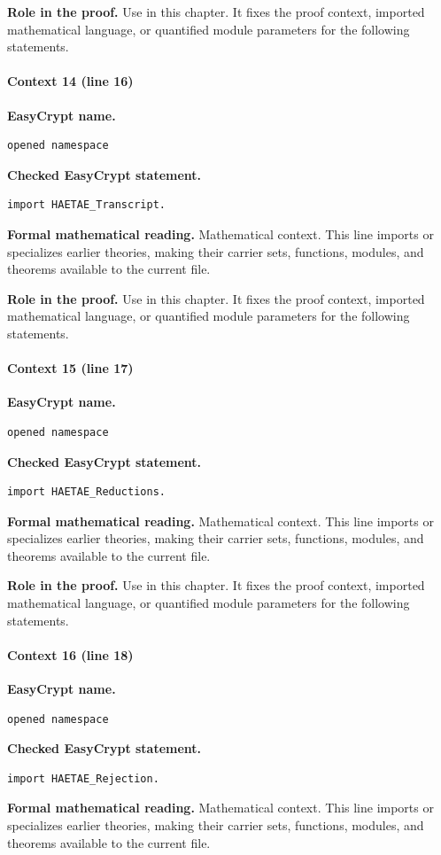 \noindent\textbf{Role in the proof.}
Use in this chapter. It fixes the proof context, imported mathematical language, or quantified module parameters for the following statements.

\paragraph{Context 14 (line 16)}
\noindent\textbf{EasyCrypt name.}
\begin{lstlisting}[language=EasyCrypt,basicstyle=\ttfamily\scriptsize]
opened namespace
\end{lstlisting}
\noindent\textbf{Checked EasyCrypt statement.}
\begin{lstlisting}[language=EasyCrypt,basicstyle=\ttfamily\scriptsize]
import HAETAE_Transcript.
\end{lstlisting}
\noindent\textbf{Formal mathematical reading.}
Mathematical context. This line imports or specializes earlier theories, making their carrier sets, functions, modules, and theorems available to the current file.

\noindent\textbf{Role in the proof.}
Use in this chapter. It fixes the proof context, imported mathematical language, or quantified module parameters for the following statements.

\paragraph{Context 15 (line 17)}
\noindent\textbf{EasyCrypt name.}
\begin{lstlisting}[language=EasyCrypt,basicstyle=\ttfamily\scriptsize]
opened namespace
\end{lstlisting}
\noindent\textbf{Checked EasyCrypt statement.}
\begin{lstlisting}[language=EasyCrypt,basicstyle=\ttfamily\scriptsize]
import HAETAE_Reductions.
\end{lstlisting}
\noindent\textbf{Formal mathematical reading.}
Mathematical context. This line imports or specializes earlier theories, making their carrier sets, functions, modules, and theorems available to the current file.

\noindent\textbf{Role in the proof.}
Use in this chapter. It fixes the proof context, imported mathematical language, or quantified module parameters for the following statements.

\paragraph{Context 16 (line 18)}
\noindent\textbf{EasyCrypt name.}
\begin{lstlisting}[language=EasyCrypt,basicstyle=\ttfamily\scriptsize]
opened namespace
\end{lstlisting}
\noindent\textbf{Checked EasyCrypt statement.}
\begin{lstlisting}[language=EasyCrypt,basicstyle=\ttfamily\scriptsize]
import HAETAE_Rejection.
\end{lstlisting}
\noindent\textbf{Formal mathematical reading.}
Mathematical context. This line imports or specializes earlier theories, making their carrier sets, functions, modules, and theorems available to the current file.

